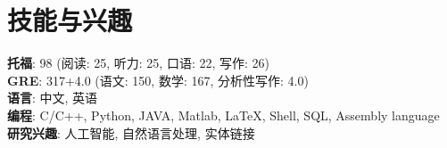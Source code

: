 \section{技能与兴趣}
\textbf{托福}: 98 (阅读: 25, 听力: 25, 口语: 22, 写作: 26)\\
\textbf{GRE}: 317+4.0 (语文: 150, 数学: 167, 分析性写作: 4.0)\\
\textbf{语言}: 中文, 英语\\
\textbf{编程}: C/C++, Python, JAVA, Matlab, LaTeX, Shell, SQL, Assembly language\\
\textbf{研究兴趣}: 人工智能, 自然语言处理, 实体链接

